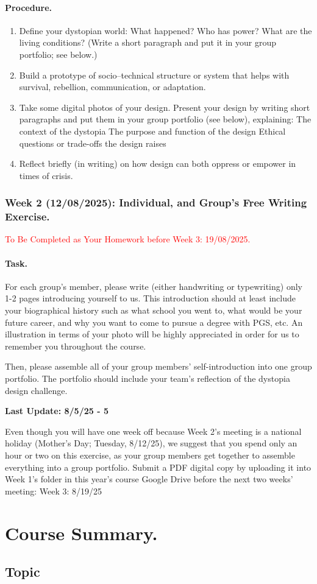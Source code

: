 \documentclass[11pt]{book}
\begin{document}
			\subsection{Procedure.}
				\begin{enumerate}
					\item Define your dystopian world: What happened? Who has power? What are the living conditions? (Write a short paragraph and put it in your group portfolio; see below.)
					\item Build a prototype of socio–technical structure or system that helps with survival, rebellion, communication, or adaptation.
					\item Take some digital photos of your design. Present your design by writing short paragraphs and put them in your group portfolio (see below), explaining:
						\subitem The context of the dystopia
						\subitem The purpose and function of the design
						\subitem Ethical questions or trade-offs the design raises
					\item Reflect briefly (in writing) on how design can both oppress or empower in times of crisis.
				\end{enumerate}
				
				
		\section{Week 2 (12/08/2025): Individual, and Group's Free Writing Exercise.}
			\textcolor{red}{To Be Completed as Your Homework before Week 3: 19/08/2025.}
			\subsection{Task.}
			For each group’s member, please write (either handwriting or typewriting) only 1-2 pages introducing yourself to us. This introduction should at least include your biographical history such as what school you went to, what would be your future career, and why you want to come to pursue a degree with PGS, etc. An illustration in terms of your photo will be highly appreciated in order for us to remember you throughout the course.
			
			Then, please assemble all of your group members’ self-introduction into one group portfolio. The portfolio should include your team’s reflection of the dystopia design challenge.
			\linebreak
			
			\textbf{Last Update: 8/5/25 - 5}
			
			Even though you will have one week off because Week 2’s meeting is a national holiday (Mother’s Day; Tuesday, 8/12/25), we suggest that you spend only an hour or two on this exercise, as your group members get together to assemble everything into a group portfolio. Submit a PDF digital copy by uploading it into Week 1’s folder in this year’s course Google Drive before the next two weeks’ meeting: Week 3: 8/19/25
\part{Course Summary.}
	\chapter{Topic}
\end{document}
